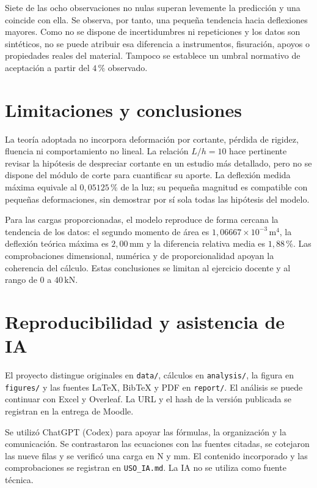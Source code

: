 \documentclass[11pt,a4paper]{article}
\begin{document}
Siete de las ocho observaciones no nulas superan levemente la predicción y una coincide con ella. Se observa, por tanto, una pequeña tendencia hacia deflexiones mayores. Como no se dispone de incertidumbres ni repeticiones y los datos son sintéticos, no se puede atribuir esa diferencia a instrumentos, fisuración, apoyos o propiedades reales del material. Tampoco se establece un umbral normativo de aceptación a partir del \ensuremath{4\,\%} observado.

\section{Limitaciones y conclusiones}
La teoría adoptada no incorpora deformación por cortante, pérdida de rigidez, fluencia ni comportamiento no lineal. La relación $L/h=10$ hace pertinente revisar la hipótesis de despreciar cortante en un estudio más detallado, pero no se dispone del módulo de corte para cuantificar su aporte. La deflexión medida máxima equivale al \ensuremath{0{,}05125\,\%} de la luz; su pequeña magnitud es compatible con pequeñas deformaciones, sin demostrar por sí sola todas las hipótesis del modelo.

Para las cargas proporcionadas, el modelo reproduce de forma cercana la tendencia de los datos: el segundo momento de área es \ensuremath{1{,}06667\times10^{-3}\,\mathrm{m}^{4}}, la deflexión teórica máxima es \ensuremath{2{,}00\,\mathrm{mm}} y la diferencia relativa media es \ensuremath{1{,}88\,\%}. Las comprobaciones dimensional, numérica y de proporcionalidad apoyan la coherencia del cálculo. Estas conclusiones se limitan al ejercicio docente y al rango de 0 a \ensuremath{40\,\mathrm{kN}}.

\section{Reproducibilidad y asistencia de IA}
El proyecto distingue originales en \texttt{data/}, cálculos en \texttt{analysis/}, la figura en \texttt{figures/} y las fuentes LaTeX, BibTeX y PDF en \texttt{report/}. El análisis se puede continuar con Excel y Overleaf. La URL y el hash de la versión publicada se registran en la entrega de Moodle.

Se utilizó ChatGPT (Codex) para apoyar las fórmulas, la organización y la comunicación. Se contrastaron las ecuaciones con las fuentes citadas, se cotejaron las nueve filas y se verificó una carga en N y mm. El contenido incorporado y las comprobaciones se registran en \texttt{USO\_IA.md}. La IA no se utiliza como fuente técnica.

\small
\setlength{\parskip}{2pt}

\end{document}
